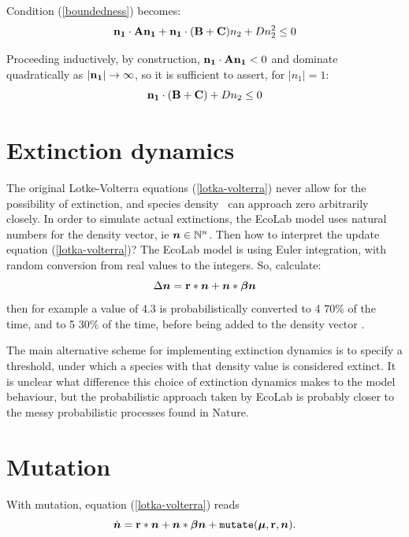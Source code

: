 \documentclass{article}
\newcommand{\br}{\mbox{${\bf r}$}} %
\newcommand{\bbeta}{\mbox{\boldmath{$\beta$}}}   %
\newcommand{\bmu}{\mbox{\boldmath{$\mu$}}}       %
\newcommand{\bn}{\mbox{\boldmath{$n$}}}          %
\providecommand{\naturals}{\mathbb{N}}
\begin{document}
Condition (\ref{boundedness}) becomes:
\begin{equation}
{\bf n_1}\cdot{\bf A}{\bf n_1} + {\bf n_1}\cdot({\bf B}+{\bf C})n_2 +
Dn_2^2 \leq 0
\end{equation}

Proceeding inductively, by construction,
${\bf n_1}\cdot{\bf A}{\bf n_1}<0$ and dominate quadratically as
$|{\bf n_1}|\rightarrow\infty$, so it is sufficient to assert, for
$|n_1|=1$:
\begin{equation}\label{boundedness2}
  {\bf n_1}\cdot({\bf B}+{\bf C}) +  Dn_2 \leq 0
\end{equation}

\section{Extinction dynamics}

The original Lotke-Volterra equations (\ref{lotka-volterra}) never
allow for the possibility of extinction, and species density \bn\ can
approach zero arbitrarily closely. In order to simulate actual
extinctions, the EcoLab model uses natural numbers for the density
vector, ie $\bn\in\naturals^n$. Then how to interpret the update
equation (\ref{lotka-volterra})? The EcoLab model is using Euler
integration, with random conversion from real values to the
integers. So, calculate:
\begin{equation}
  \Delta \bn = \br*\bn + \bn*\bbeta\bn
\end{equation}
then for example a value of 4.3 is probabilistically converted to 4
70\% of the time, and to 5 30\% of the time, before being added to the
density vector \bn.

The main alternative scheme for implementing extinction dynamics is to
specify a threshold, under which a species with that density value is
considered extinct. It is unclear what difference this choice of
extinction dynamics makes to the model behaviour, but the
probabilistic approach taken by EcoLab is probably closer to the messy
probabilistic processes found in Nature.

\section{Mutation}\label{mutation}

With mutation, equation (\ref{lotka-volterra}) reads
\begin{equation}
\dot{\bn} = \br*\bn + \bn*\bbeta\bn + {\tt mutate}(\bmu,\br,\bn).
\end{equation}
\end{document}
